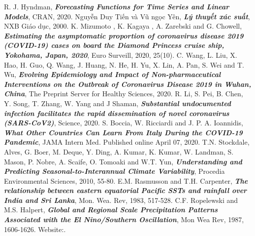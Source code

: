 \documentclass[12pt, a4paper,oneside]{book}
\theoremstyle{definition}
\begin{document}
\begin{thebibliography}{99}
	 R. J. Hyndman, \textbf{\textit{Forecasting Functions for Time Series and Linear Models}}, CRAN, 2020.
	 Nguyễn Duy Tiến và Vũ ngọc Yên, \textbf{\textit{Lý thuyết xác suất}}, NXB Giáo dục, 2000.
	  K. Mizumoto , K. Kagaya , A. Zarebski and G. Chowell, \textbf{\textit{Estimating the asymptomatic proportion of coronavirus disease 2019 (COVID-19) cases on board the Diamond Princess cruise ship, Yokohama, Japan, 2020}},  Euro Surveill, 2020, 25(10).
	 C. Wang, L. Liu, X. Hao, H. Guo, Q. Wang, J. Huang, N. He, H. Yu, X. Lin, A. Pan, S. Wei and T. Wu, \textbf{\textit{Evolving Epidemiology and Impact of Non-pharmaceutical Interventions on the Outbreak of Coronavirus Disease 2019 in Wuhan, China}}, The Preprint Server for Healthy Sciences, 2020.
	 R. Li, S. Pei, B. Chen, Y. Song, T. Zhang, W. Yang and J Shaman, \textbf{\textit{Substantial undocumented infection facilitates the rapid dissemination of novel coronavirus (SARS-CoV2)}}, Science, 2020.
	 S. Boccia, W. Ricciardi and J. P. A. Ioannidis, \textbf{\textit{What Other Countries Can Learn From Italy During the COVID-19 Pandemic}}, JAMA Intern Med. Published online April 07, 2020.
	 T.N. Stockdale, Alves, G. Boer, M. Deque, Y. Ding, A. Kumar, K. Kumar, W. Landman, S. Mason, P. Nobre, A. Scaife, O. Tomoaki and W.T. Yun, \textbf{\textit{Understanding and Predicting Seasonal-to-Interannual Climate Variability}}, Procedia Environmental Sciences, 2010, 55-80.
	 E.M. Rasmusson and T.H. Carpenter, \textbf{\textit{The relationship between eastern equatorial Pacific SSTs and rainfall over India and Sri Lanka}}, Mon. Wea. Rev, 1983, 517-528.
	 C.F. Ropelewski and M.S. Halpert, \textbf{\textit{Global and Regional Scale Precipitation Patterns Associated with the El Nino/Southern Oscillation}}, Mon Wea Rev, 1987, 1606-1626.
	 Website:.
	

		
\end{thebibliography}	
\end{document}
